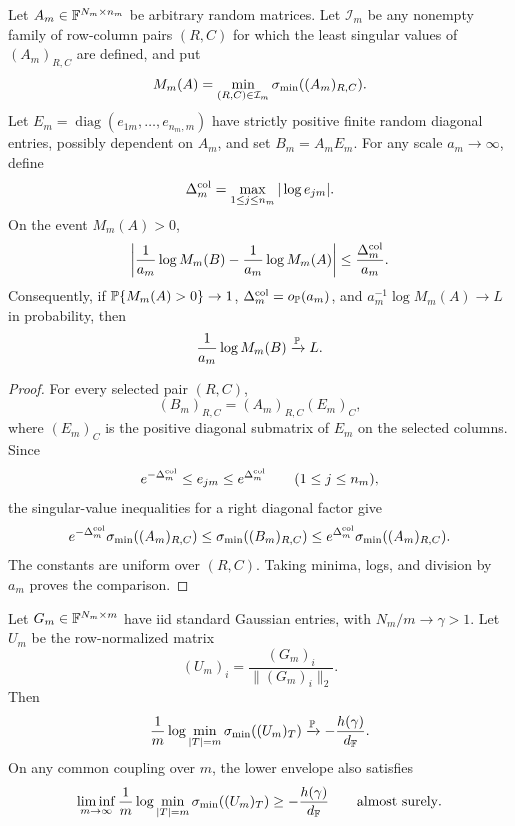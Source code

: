 \begin{proposition}\label{prop:random-column-weight}
Let \(A_m\in\mathbb{F}^{N_m\times n_m}\) be arbitrary random matrices.  Let
\(\mathcal I_m\) be any nonempty family of row-column pairs \((R,C)\) for which the
least singular values of \((A_m)_{R,C}\) are defined, and put
\[
  M_m(A)=\min_{(R,C)\in\mathcal I_m}\sigma_{\min}((A_m)_{R,C}).
\]
Let \(E_m=\operatorname{diag}(e_{1m},\ldots,e_{n_m,m})\) have strictly positive
finite random diagonal entries, possibly dependent on \(A_m\), and set
\(B_m=A_mE_m\).  For any scale \(a_m\to\infty\), define
\[
  \Delta_m^{\rm col}=\max_{1\le j\le n_m}|\log e_{jm}|.
\]
On the event \(M_m(A)>0\),
\[
  \left|\frac1{a_m}\log M_m(B)-\frac1{a_m}\log M_m(A)\right|
  \le \frac{\Delta_m^{\rm col}}{a_m}.
\]
Consequently, if \(\mathbb{P}\{M_m(A)>0\}\to1\),
\(\Delta_m^{\rm col}=o_{\mathbb{P}}(a_m)\), and
\(a_m^{-1}\log M_m(A)\to L\) in probability, then
\[
  \frac1{a_m}\log M_m(B)\xrightarrow{\mathbb{P}} L.
\]
\end{proposition}

\begin{proof}
For every selected pair \((R,C)\),
\[
  (B_m)_{R,C}=(A_m)_{R,C}(E_m)_C ,
\]
where \((E_m)_C\) is the positive diagonal submatrix of \(E_m\) on the selected
columns.  Since
\[
  e^{-\Delta_m^{\rm col}}\le e_{jm}\le e^{\Delta_m^{\rm col}}
  \qquad(1\le j\le n_m),
\]
the singular-value inequalities for a right diagonal factor give
\[
  e^{-\Delta_m^{\rm col}}\sigma_{\min}((A_m)_{R,C})
  \le \sigma_{\min}((B_m)_{R,C})
  \le e^{\Delta_m^{\rm col}}\sigma_{\min}((A_m)_{R,C}).
\]
The constants are uniform over \((R,C)\).  Taking minima, logs, and division by
\(a_m\) proves the comparison.
\end{proof}

\begin{corollary}\label{cor:row-normalized-gaussian}
Let \(G_m\in\mathbb{F}^{N_m\times m}\) have iid standard Gaussian entries, with
\(N_m/m\to\gamma>1\).  Let \(U_m\) be the row-normalized matrix
\[
  (U_m)_i=\frac{(G_m)_i}{\|(G_m)_i\|_2}.
\]
Then
\[
  \frac1m\log\min_{|T|=m}\sigma_{\min}((U_m)_T)
  \xrightarrow{\mathbb{P}}-\frac{h(\gamma)}{d_{\mathbb{F}}}.
\]
On any common coupling over \(m\), the lower envelope also satisfies
\[
  \liminf_{m\to\infty}\frac1m\log\min_{|T|=m}\sigma_{\min}((U_m)_T)
  \ge -\frac{h(\gamma)}{d_{\mathbb{F}}}
  \qquad\hbox{almost surely}.
\]
\end{corollary}

